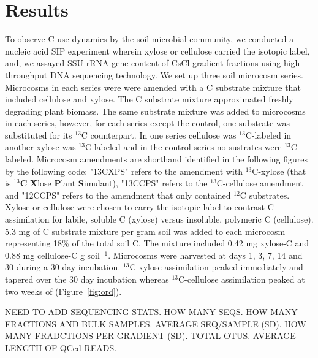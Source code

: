 \section{Results}
To observe C use dynamics by the soil microbial community, we conducted a
nucleic acid SIP experiment wherein xylose or cellulose carried the isotopic
label, and, we assayed SSU rRNA gene content of CsCl gradient fractions using
high-throughput DNA sequencing technology. We set up three soil microcosm series. 
Microcosms in each series were were amended with a C substrate mixture
that included cellulose and xylose. The C substrate mixture approximated
freshly degrading plant biomass. The same substrate mixture was added to microcosms
in each series, however, for each series except the control, one substrate
was substituted for its $^{13}$C counterpart. In one series cellulose was
$^{13}$C-labeled in another xylose was $^{13}$C-labeled and in the control
series no sustrates were $^{13}$C labeled. Microcosm amendments are shorthand identified
in the following figures by the following code: "13CXPS" refers to the
amendment with $^{13}$C-xylose (that is $^{13}$\textbf{C} \textbf{X}lose
\textbf{P}lant \textbf{S}imulant), "13CCPS" refers to the $^{13}$C-cellulose
amendment and "12CCPS" refers to the amendment that only contained $^{12}$C
substrates. Xylose or cellulose were chosen to carry the isotopic label to
contrast C assimilation for labile, soluble C (xylose) versus
insoluble, polymeric C (cellulose).  5.3 mg of C substrate mixture per gram
soil was added to each microcosm representing 18\% of the total soil C. The
mixture included 0.42 mg xylose-C and 0.88 mg cellulose-C g soil$^{-1}$.
Microcosms were harvested at days 1, 3, 7, 14 and 30  during a 30 day
incubation. $^{13}$C-xylose assimilation peaked immediately and tapered
over the 30 day incubation whereas $^{13}$C-cellulose assimilation peaked at
two weeks of (Figure~\ref{fig:ord}).

NEED TO ADD SEQUENCING STATS. HOW MANY SEQS. HOW MANY FRACTIONS AND BULK SAMPLES. 
AVERAGE SEQ/SAMPLE (SD). HOW MANY FRADCTIONS PER GRADIENT (SD). TOTAL OTUS. AVERAGE
LENGTH OF QCed READS.

